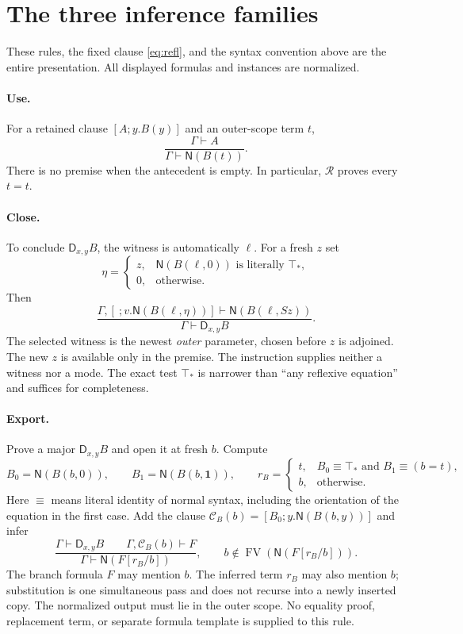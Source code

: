 \documentclass[11pt,letterpaper]{article}
\theoremstyle{definition}\newtheorem{definition}[theorem]{Definition}
\theoremstyle{remark}\newtheorem{remark}[theorem]{Remark}
\newcommand{\NF}{\mathsf N}
\newcommand{\DD}{\mathsf D}
\newcommand{\FV}{\operatorname{FV}}
\newcommand{\one}{\mathbf 1}
\newcommand{\ttop}{\top_*}
\begin{document}
\section{The three inference families}\label{sec:rules}
These rules, the fixed clause \eqref{eq:refl}, and the syntax convention
above are the entire presentation. All displayed formulas and instances
are normalized.

\paragraph{Use.}
For a retained clause $[A;y.B(y)]$ and an outer-scope term $t$,
\[
 \frac{\Gamma\vdash A}{\Gamma\vdash\NF(B(t))}.
 \tag{Use}
\]
There is no premise when the antecedent is empty. In particular,
$\mathcal R$ proves every $t=t$.

\paragraph{Close.}
To conclude $\DD_{x,y}B$, the witness is automatically $\ell$.
For a fresh $z$ set
\[
 \eta=\begin{cases}
 z,&\NF(B(\ell,0))\text{ is literally }\ttop,\\
 0,&\text{otherwise}.
 \end{cases}
\]
Then
\begin{equation}\label{rule:close}
 \frac{\Gamma,[\ ;v.\NF(B(\ell,\eta))]\vdash
                     \NF(B(\ell,Sz))}
      {\Gamma\vdash\DD_{x,y}B}.
 \tag{Close}
\end{equation}
The selected witness is the newest \emph{outer} parameter, chosen before
$z$ is adjoined. The new $z$ is available only in the premise.
The instruction supplies neither a witness nor a mode. The exact test
$\ttop$ is narrower than ``any reflexive equation'' and suffices for
completeness.

\paragraph{Export.}
Prove a major $\DD_{x,y}B$ and open it at fresh $b$. Compute
\[
 B_0=\NF(B(b,0)),\qquad B_1=\NF(B(b,\one)),\qquad
 r_B=\begin{cases}
 t,&B_0\equiv\ttop\text{ and }B_1\equiv(b=t),\\
 b,&\text{otherwise}.
 \end{cases}
\]
Here $\equiv$ means literal identity of normal syntax, including the
orientation of the equation in the first case. Add the clause
$\mathcal C_B(b)=[B_0;y.\NF(B(b,y))]$ and infer
\begin{equation}\label{rule:export}
 \frac{\Gamma\vdash\DD_{x,y}B\qquad
       \Gamma,\mathcal C_B(b)\vdash F}
      {\Gamma\vdash\NF(F[r_B/b])},
 \qquad b\notin\FV(\NF(F[r_B/b])).
 \tag{Export}
\end{equation}
The branch formula $F$ may mention $b$. The inferred term $r_B$ may also
mention $b$; substitution is one simultaneous pass and does not recurse
into a newly inserted copy. The normalized output must lie in the outer
scope. No equality proof, replacement term, or separate formula template
is supplied to this rule.
\end{document}
